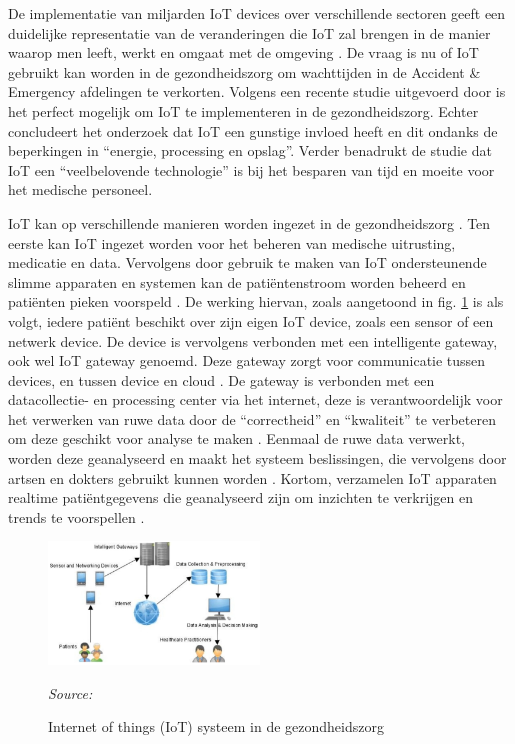 De implementatie van miljarden \autocite{Dawod2022} IoT devices over verschillende sectoren geeft een duidelijke representatie van de veranderingen die IoT zal brengen in de manier waarop men leeft, werkt en omgaat met de omgeving \autocite{Almutairi2024}. De vraag is nu of IoT gebruikt kan worden in de gezondheidszorg om wachttijden in de Accident \& Emergency afdelingen te verkorten. Volgens een recente studie uitgevoerd door \autocite{Singh2023} is het perfect mogelijk om IoT te implementeren in de gezondheidszorg. Echter concludeert het onderzoek dat IoT een gunstige invloed heeft en dit ondanks de beperkingen in “energie, processing en opslag”. Verder benadrukt de studie dat IoT een “veelbelovende technologie” is bij het besparen van tijd en moeite voor het medische personeel. 


IoT kan op verschillende manieren worden ingezet in de gezondheidszorg \autocite{Huang2021}. Ten eerste kan IoT ingezet worden voor het beheren van medische uitrusting, medicatie en data. Vervolgens door gebruik te maken van IoT ondersteunende slimme apparaten en systemen kan de patiëntenstroom worden beheerd \autocite{Almotaira2023} en patiënten pieken voorspeld \autocite{King2022}. De werking hiervan, zoals aangetoond in fig. \ref{fig:Figuur4} is als volgt, iedere patiënt beschikt over zijn eigen IoT device, zoals een sensor of een netwerk device. De device is vervolgens verbonden met een intelligente gateway, ook wel IoT gateway genoemd. Deze gateway zorgt voor communicatie tussen devices, en tussen device en cloud \autocite{Upadrista2021}. De gateway is verbonden met een datacollectie- en processing center via het internet, deze is verantwoordelijk voor het verwerken van ruwe data door de “correctheid” en “kwaliteit” te verbeteren om deze geschikt voor analyse te maken \autocite{Sirisha2023}. Eenmaal de ruwe data verwerkt, worden deze geanalyseerd en maakt het systeem beslissingen, die vervolgens door artsen en dokters gebruikt kunnen worden \autocite{Singh2023}. Kortom, verzamelen IoT apparaten realtime patiëntgegevens die geanalyseerd zijn om inzichten te verkrijgen en trends te voorspellen \autocite{Alrehaili2023, Sidhu2023}. 

\begin{figure}[h]
    \centering
    \includegraphics[width=0.5\textwidth]{img/Figuur-4}
    \caption{Internet of things (IoT) systeem in de gezondheidszorg}
    \label{fig:Figuur4}
    \textit{Source: \autocite{Singh2023}}
\end{figure}

